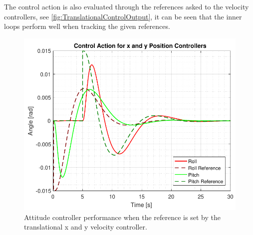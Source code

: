 The control action is also evaluated through the references asked to the velocity controllers, see \autoref{fig:TranslationalControlOutput}, it can be seen that the inner loops perform well when tracking the given references.
\begin{figure}[H]
	\centering
	\includegraphics[scale=0.65]{figures/simTranslationalXYOutput}
	\caption{Attitude controller performance when the reference is set by the translational x and y velocity controller.}
	\label{fig:TranslationalControlXYOutput}
\end{figure}
